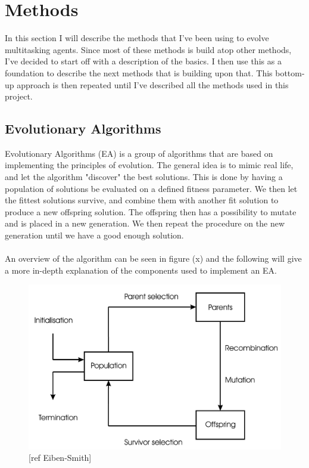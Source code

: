 \documentclass[11pt, a4paper]{article}
\begin{document}
\author{Mads Anthony}
\section{Methods}
In this section I will describe the methods that I've been using to evolve multitasking agents. Since most of these methods is build atop other methods, I've decided to start off with a description of the basics. I then use this as a foundation to describe the next methods that is building upon that. This bottom-up approach is then repeated until I've described all the methods used in this project.
\subsection{Evolutionary Algorithms}
Evolutionary Algorithms (EA) is a group of algorithms that are based on implementing the principles of evolution. The general idea is to mimic real life, and let the algorithm "discover" the best solutions. This is done by having a population of solutions be evaluated on a defined fitness parameter. We then let the fittest solutions survive, and combine them with another fit solution to produce a new offspring solution. The offspring then has a possibility to mutate and is placed in a new generation. We then repeat the procedure on the new generation until we have a good enough solution.
\\
\\
An overview of the algorithm can be seen in figure (x) and the following will give a more in-depth explanation of the components used to implement an EA.
\begin{figure}[!ht]
\centering
\includegraphics[scale=0.2]{EA_Figure}
\caption{[ref Eiben-Smith]}
\end{figure}
\end{document}
